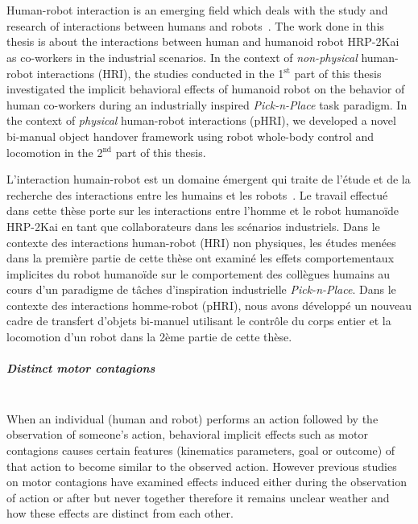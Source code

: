 {\color{blue}\chapter*{}}
\thispagestyle{empty}

Human-robot interaction is an emerging field which deals with the study and research of interactions between humans and robots~\cite{goodrich2008human}. The work done in this thesis is about the interactions between human and humanoid robot HRP-2Kai as co-workers in the industrial scenarios. In the context of \textit{non-physical} human-robot interactions (HRI), the studies conducted in the 1$^\text{st}$ part of this thesis investigated the implicit behavioral effects of humanoid robot on the behavior of human co-workers during an industrially inspired \textit{Pick-n-Place} task paradigm. In the context of \textit{physical} human-robot interactions (pHRI), we developed a novel bi-manual object handover framework using robot whole-body control and locomotion in the 2$^\text{nd}$ part of this thesis.

L'interaction humain-robot est un domaine émergent qui traite de l'étude et de la recherche des interactions entre les humains et les robots~\cite{goodrich2008human}. Le travail effectué dans cette thèse porte sur les interactions entre l'homme et le robot humanoïde HRP-2Kai en tant que collaborateurs dans les scénarios industriels. Dans le contexte des interactions human-robot (HRI) non physiques, les études menées dans la première partie de cette thèse ont examiné les effets comportementaux implicites du robot humanoïde sur le comportement des collègues humains au cours d'un paradigme de tâches d'inspiration industrielle \textit{Pick-n-Place}. Dans le contexte des interactions homme-robot (pHRI), nous avons développé un nouveau cadre de transfert d'objets bi-manuel utilisant le contrôle du corps entier et la locomotion d'un robot dans la 2ème partie de cette thèse.\\

\paragraph*{\LARGE {Distinct motor contagions \\}\\}

When an individual (human and robot) performs an action followed by the observation of someone's action, behavioral implicit effects such as motor contagions causes certain features (kinematics parameters, goal or outcome) of that action to become similar to the observed action. However previous studies on motor contagions have examined  effects induced either during the observation of action or after but never together therefore it remains unclear weather and how these effects are distinct from each other.

